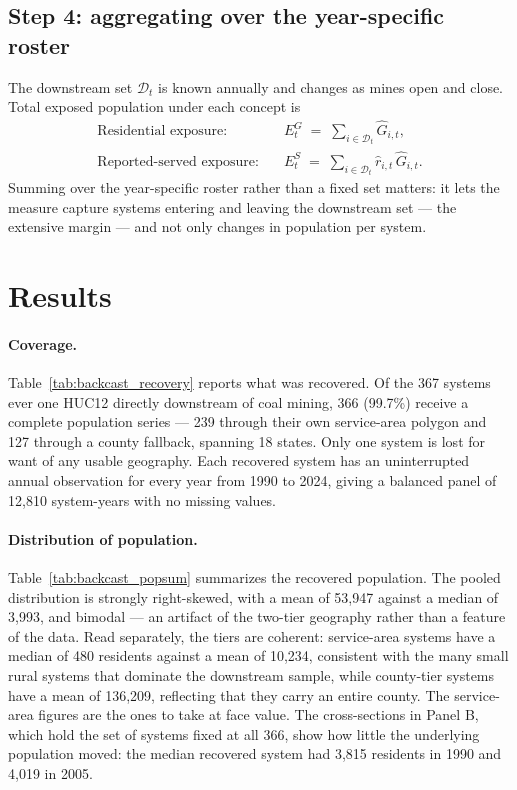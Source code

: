 \documentclass[11pt]{article}
\begin{document}
\subsection{Step 4: aggregating over the year-specific roster}
\label{sec:exposure}

The downstream set $\mathcal{D}_t$ is known annually and changes as mines open
and close. Total exposed population under each concept is
\begin{align}
\text{Residential exposure:}\quad & E^{G}_t \;=\; \sum_{i\in\mathcal{D}_t} \hat G_{i,t}, \\
\text{Reported-served exposure:}\quad & E^{S}_t \;=\; \sum_{i\in\mathcal{D}_t} \hat r_{i,t}\,\hat G_{i,t}.
\end{align}
Summing over the year-specific roster rather than a fixed set matters: it lets
the measure capture systems entering and leaving the downstream set --- the
extensive margin --- and not only changes in population per system.

\section{Results}
\label{sec:results}

\paragraph{Coverage.}
Table~\ref{tab:backcast_recovery} reports what was recovered. Of the 367
systems ever one HUC12 directly downstream of coal mining, 366 (99.7\%)
receive a complete population series --- 239 through their own service-area
polygon and 127 through a county fallback, spanning 18 states. Only one
system is lost for want of any usable geography. Each recovered system has an
uninterrupted annual observation for every year from 1990 to 2024, giving a
balanced panel of 12,810 system-years with no missing values.



\paragraph{Distribution of population.}
Table~\ref{tab:backcast_popsum} summarizes the recovered population. The
pooled distribution is strongly right-skewed, with a mean of 53,947 against a
median of 3,993, and bimodal --- an artifact of the two-tier geography rather
than a feature of the data. Read separately, the tiers are coherent:
service-area systems have a median of 480 residents against a mean of 10,234,
consistent with the many small rural systems that dominate the downstream
sample, while county-tier systems have a mean of 136,209, reflecting that they
carry an entire county. The service-area figures are the ones to take at face
value. The cross-sections in Panel B, which hold the set of systems fixed at
all 366, show how little the underlying population moved: the median
recovered system had 3,815 residents in 1990 and 4,019 in 2005.
\end{document}
